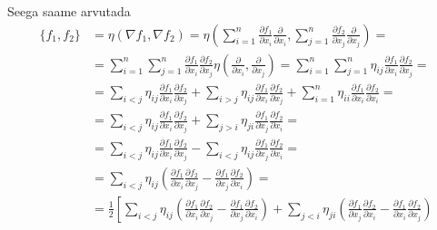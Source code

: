 Seega saame arvutada
\begin{align*}
    \{f_1, f_2\} &= \eta(\nabla f_1, \nabla f_2)
    = \eta\left(
        \sum_{i=1}^{n}
            \frac{\partial f_1}{\partial x_i}
            \frac{\partial}{\partial x_i},
        \sum_{j=1}^{n}
            \frac{\partial f_2}{\partial x_j}
            \frac{\partial}{\partial x_j}
    \right) = \\
    &= \sum_{i=1}^{n} \sum_{j=1}^{n}
        \frac{\partial f_1}{\partial x_i}
        \frac{\partial f_2}{\partial x_j}
        \eta\left(
            \frac{\partial}{\partial x_i},
            \frac{\partial}{\partial x_j}
        \right)
    = \sum_{i=1}^{n} \sum_{j=1}^{n} \eta_{ij}
        \frac{\partial f_1}{\partial x_i}
        \frac{\partial f_2}{\partial x_j} = \\
    &= \sum_{i < j} \eta_{ij}
        \frac{\partial f_1}{\partial x_i}
        \frac{\partial f_2}{\partial x_j} +
    \sum_{i > j} \eta_{ij}
        \frac{\partial f_1}{\partial x_i}
        \frac{\partial f_2}{\partial x_j} +
    \sum_{i = 1}^{n} \eta_{ii}
        \frac{\partial f_1}{\partial x_i}
        \frac{\partial f_2}{\partial x_i} = \\
    &= \sum_{i < j} \eta_{ij}
        \frac{\partial f_1}{\partial x_i}
        \frac{\partial f_2}{\partial x_j} +
    \sum_{j > i} \eta_{ji}
        \frac{\partial f_1}{\partial x_j}
        \frac{\partial f_2}{\partial x_i} = \\
    &= \sum_{i < j} \eta_{ij}
        \frac{\partial f_1}{\partial x_i}
        \frac{\partial f_2}{\partial x_j} -
    \sum_{i < j} \eta_{ij}
        \frac{\partial f_1}{\partial x_j}
        \frac{\partial f_2}{\partial x_i} = \\
    &= \sum_{i < j} \eta_{ij} \left(
        \frac{\partial f_1}{\partial x_i}
        \frac{\partial f_2}{\partial x_j} -
        \frac{\partial f_1}{\partial x_j}
        \frac{\partial f_2}{\partial x_i}
    \right) = \\
    &= \frac{1}{2} \left[
        \sum_{i < j}
            \eta_{ij} \left(
                \frac{\partial f_1}{\partial x_i}
                \frac{\partial f_2}{\partial x_j} -
                \frac{\partial f_1}{\partial x_j}
                \frac{\partial f_2}{\partial x_i}
            \right)
        + \sum_{j < i}
            \eta_{ji} \left(
                \frac{\partial f_1}{\partial x_j}
                \frac{\partial f_2}{\partial x_i} -
                \frac{\partial f_1}{\partial x_i}
                \frac{\partial f_2}{\partial x_j}
            \right)

\end{align*}
